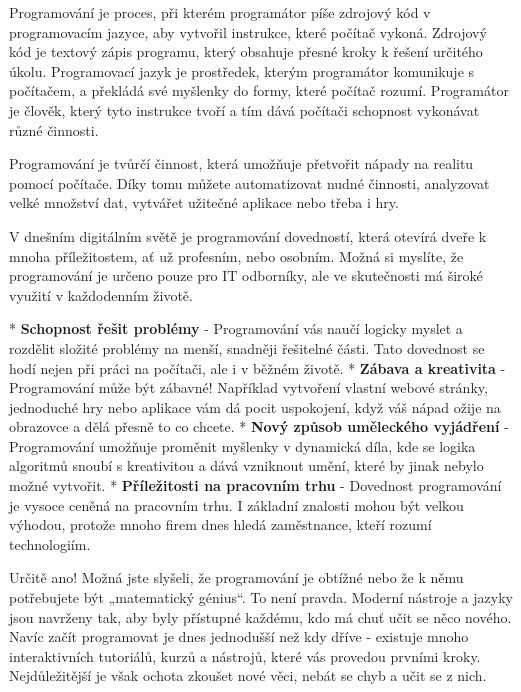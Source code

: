 Programování je proces, při kterém programátor píše zdrojový kód v programovacím jazyce, aby vytvořil instrukce, které počítač vykoná. Zdrojový kód je textový zápis programu, který obsahuje přesné kroky k řešení určitého úkolu. Programovací jazyk je prostředek, kterým programátor komunikuje s počítačem, a překládá své myšlenky do formy, které počítač rozumí. Programátor je člověk, který tyto instrukce tvoří a tím dává počítači schopnost vykonávat různé činnosti.

Programování je tvůrčí činnost, která umožňuje přetvořit nápady na realitu pomocí počítače. Díky tomu můžete automatizovat nudné činnosti, analyzovat velké množství dat, vytvářet užitečné aplikace nebo třeba i hry. 

V dnešním digitálním světě je programování dovedností, která otevírá dveře k mnoha příležitostem, ať už profesním, nebo osobním. Možná si myslíte, že programování je určeno pouze pro IT odborníky, ale ve skutečnosti má široké využití v každodenním životě.

\begitems
* {\bf Schopnost řešit problémy} - Programování vás naučí logicky myslet a rozdělit složité problémy na menší, snadněji řešitelné části. Tato dovednost se hodí nejen při práci na počítači, ale i v běžném životě.
* {\bf Zábava a kreativita} - Programování může být zábavné! Například vytvoření vlastní webové stránky, jednoduché hry nebo aplikace vám dá pocit uspokojení, když váš nápad ožije na obrazovce a dělá přesně to co chcete.
* {\bf Nový způsob uměleckého vyjádření} - Programování umožňuje proměnit myšlenky v dynamická díla, kde se logika algoritmů snoubí s kreativitou a dává vzniknout umění, které by jinak nebylo možné vytvořit.
* {\bf Příležitosti na pracovním trhu} - Dovednost programování je vysoce ceněná na pracovním trhu. I základní znalosti mohou být velkou výhodou, protože mnoho firem dnes hledá zaměstnance, kteří rozumí technologiím.
\enditems

Určitě ano! Možná jste slyšeli, že programování je obtížné nebo že k němu potřebujete být „matematický génius“. To není pravda. Moderní nástroje a jazyky jsou navrženy tak, aby byly přístupné každému, kdo má chuť učit se něco nového.
Navíc začít programovat je dnes jednodušší než kdy dříve - existuje mnoho interaktivních tutoriálů, kurzů a nástrojů, které vás provedou prvními kroky. Nejdůležitější je však ochota zkoušet nové věci, nebát se chyb a učit se z nich.
